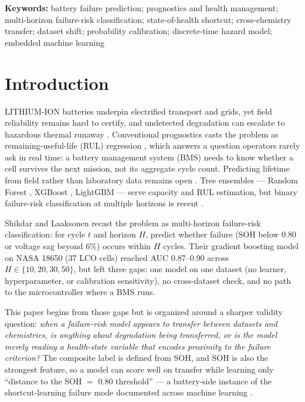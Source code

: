 \documentclass[11pt,a4paper]{article}
\begin{document}
\medskip
\noindent\textbf{Keywords:} battery failure prediction; prognostics and health management; multi-horizon failure-risk classification; state-of-health shortcut; cross-chemistry transfer; dataset shift; probability calibration; discrete-time hazard model; embedded machine learning

\vspace{4pt}
\section{Introduction}
LITHIUM-ION batteries underpin electrified transport and grids, yet field reliability remains hard to certify, and undetected degradation can escalate to hazardous thermal runaway \cite{feng2018thermal}. Conventional prognostics casts the problem as remaining-useful-life (RUL) regression \cite{meng2019review,roman2021machine,ng2020predicting}, which answers a question operators rarely ask in real time: a battery management system (BMS) \cite{hannan2017review} needs to know whether a cell survives the next mission, not its aggregate cycle count. Predicting lifetime from field rather than laboratory data remains open \cite{sulzer2021challenge}. Tree ensembles --- Random Forest \cite{breiman2001random}, XGBoost \cite{chen2016xgboost}, LightGBM \cite{ke2017lightgbm} --- serve capacity and RUL estimation, but binary failure-risk classification at multiple horizons is recent \cite{shikdar2026learning}.

Shikdar and Laaksonen \cite{shikdar2026learning} recast the problem as multi-horizon failure-risk classification: for cycle $t$ and horizon $H$, predict whether failure (SOH below 0.80 or voltage sag beyond 6\%) occurs within $H$ cycles. Their gradient boosting model on NASA 18650 (37 LCO cells) reached AUC 0.87--0.90 across $H \in \{10,20,30,50\}$, but left three gaps: one model on one dataset (no learner, hyperparameter, or calibration sensitivity), no cross-dataset check, and no path to the microcontroller where a BMS runs.

This paper begins from those gaps but is organized around a sharper validity question: \emph{when a failure-risk model appears to transfer between datasets and chemistries, is anything about degradation being transferred, or is the model merely reading a health-state variable that encodes proximity to the failure criterion?} The composite label is defined from SOH, and SOH is also the strongest feature, so a model can score well on transfer while learning only ``distance to the SOH $=$ 0.80 threshold'' --- a battery-side instance of the shortcut-learning failure mode documented across machine learning \cite{geirhos2020shortcut}.
\end{document}
